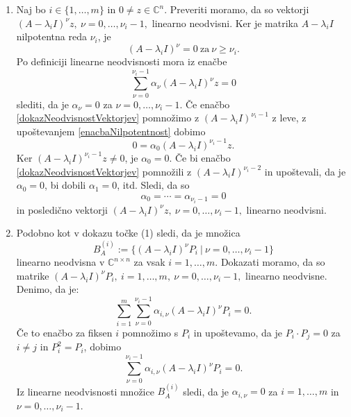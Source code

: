 \documentclass[mat1]{fmfdelo}
\newcommand{\C}{\mathbb C}
\begin{document}
\begin{dokaz}
    \leavevmode
    \begin{enumerate}
        \item Naj bo $i \in \{1, \ldots, m\}$ in $0 \neq z \in \C^n$. Preveriti moramo, da so vektorji $(A - \lambda_i I)^\nu z,\ \nu = 0, \ldots, \nu_i-1,$ linearno neodvisni. Ker je matrika $A - \lambda_i I$ nilpotentna reda $\nu_i$, je
        \begin{equation}\label{enacbaNilpotentnost}
            (A - \lambda_i I)^\nu = 0\ \text{za}\ \nu \geq \nu_i.
        \end{equation}
        Po definiciji linearne neodvisnosti mora iz enačbe
        \begin{equation}\label{dokazNeodvisnostVektorjev}
            \sum_{\nu = 0}^{\nu_i - 1} \alpha_\nu (A - \lambda_i I)^\nu z = 0
        \end{equation}
        slediti, da je $\alpha_\nu = 0$ za $\nu = 0, \ldots, \nu_i-1$. Če enačbo \eqref{dokazNeodvisnostVektorjev} pomnožimo z $(A - \lambda_i I)^{\nu_i-1}$ z leve, z upoštevanjem \eqref{enacbaNilpotentnost} dobimo
        \begin{equation*}
            0 = \alpha_0 (A-\lambda_i I)^{\nu_i-1} z.
        \end{equation*}
        Ker $(A-\lambda_i I)^{\nu_i-1} z \neq 0$, je $\alpha_0 = 0$. Če bi enačbo \eqref{dokazNeodvisnostVektorjev} pomnožili z $(A - \lambda_i I)^{\nu_i-2}$ in upoštevali, da je $\alpha_0 = 0$, bi dobili $\alpha_1 = 0$, itd. Sledi, da so \[\alpha_0 = \cdots = \alpha_{\nu_i - 1} = 0\] in posledično vektorji $(A - \lambda_i I)^\nu z,\ \nu = 0, \ldots, \nu_i-1,$ linearno neodvisni.

        \item Podobno kot v dokazu točke (1) sledi, da je množica
        \begin{equation*}
            B_A^{(i)} := \{(A-\lambda_i I)^\nu P_i\ |\ \nu = 0, \ldots, \nu_i-1\}
        \end{equation*}
        linearno neodvisna v $\C^{n \times n}$ za vsak $i = 1, \ldots, m$. Dokazati moramo, da so matrike $(A-\lambda_i I)^{\nu} P_i,\ i = 1, \ldots, m,\ \nu = 0, \ldots, \nu_i-1,$ linearno neodvisne. Denimo, da je:
        \begin{equation*}
            \sum_{i=1}^m \sum_{\nu=0}^{\nu_i-1} \alpha_{i, \nu} (A-\lambda_i I)^{\nu} P_i = 0.
        \end{equation*}
        Če to enačbo za fiksen $i$ pomnožimo s $P_i$ in upoštevamo, da je $P_i \cdot P_j = 0$ za $i \neq j$ in $P_i^2 = P_i$, dobimo
        \begin{equation*}
            \sum_{\nu = 0}^{\nu_i - 1} \alpha_{i, \nu} (A-\lambda_i I)^{\nu} P_i = 0.
        \end{equation*}
        Iz linearne neodvisnosti množice $B_A^{(i)}$ sledi, da je $\alpha_{i, \nu} = 0$ za $i = 1, \ldots, m$ in $\nu = 0, \ldots, \nu_i-1$.
    \end{enumerate}
\end{dokaz}
\end{document}
